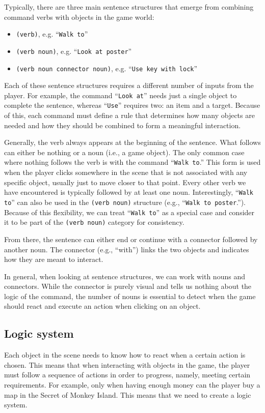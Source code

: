 Typically, there are three main sentence structures that emerge from combining command verbs with objects in the game world:
\begin{itemize}
    \item \verb|(verb)|, e.g. “\texttt{Walk to}”
    \item \verb|(verb noun)|, e.g. “\texttt{Look at poster}”
    \item \verb|(verb noun connector noun)|, e.g. “\texttt{Use key with lock}”
\end{itemize}

Each of these sentence structures requires a different number of inputs from the player. For example, the command “\texttt{Look at}” needs just a single object to complete the sentence, whereas “\texttt{Use}” requires two: an item and a target. Because of this, each command must define a rule that determines how many objects are needed and how they should be combined to form a meaningful interaction.

Generally, the verb always appears at the beginning of the sentence. What follows can either be nothing or a noun (i.e., a game object). The only common case where nothing follows the verb is with the command “\texttt{Walk to}.” This form is used when the player clicks somewhere in the scene that is not associated with any specific object, usually just to move closer to that point. Every other verb we have encountered is typically followed by at least one noun. Interestingly, “\texttt{Walk to}” can also be used in the \verb|(verb noun)| structure (e.g., “\texttt{Walk to poster}.”). Because of this flexibility, we can treat “\texttt{Walk to}” as a special case and consider it to be part of the \verb|(verb noun)| category for consistency.

From there, the sentence can either end or continue with a connector followed by another noun. The connector (e.g., “with”) links the two objects and indicates how they are meant to interact.

In general, when looking at sentence structures, we can work with nouns and connectors. While the connector is purely visual and tells us nothing about the logic of the command, the number of nouns is essential to detect when the game should react and execute an action when clicking on an object. 

\subsection{Logic system}
Each object in the scene needs to know how to react when a certain action is chosen. This means that when interacting with objects in the game, the player must follow a sequence of actions in order to progress, namely, meeting certain requirements. For example, only when having enough money can the player buy a map in the Secret of Monkey Island. This means that we need to create a logic system.

